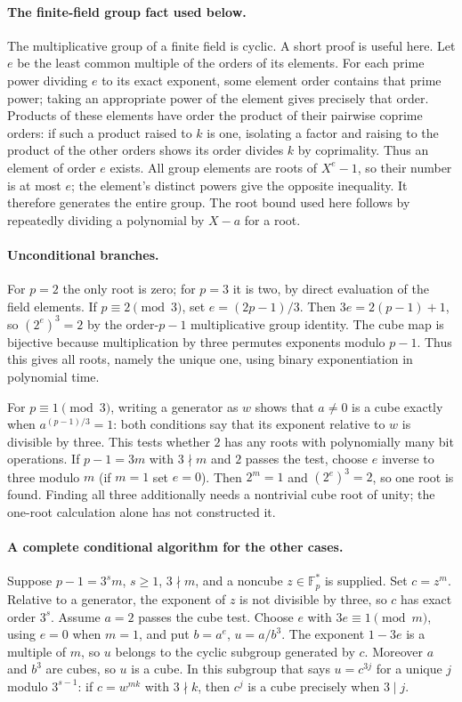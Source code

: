 \documentclass[11pt]{article}
\begin{document}
\paragraph{The finite-field group fact used below.}
The multiplicative group of a finite field is cyclic. A short proof
is useful here. Let $e$ be the least common multiple of the orders
of its elements. For each prime power dividing $e$ to its exact
exponent, some element order contains that prime power; taking an
appropriate power of the element gives precisely that order. Products
of these elements have order the product of their pairwise coprime
orders: if such a product raised to $k$ is one, isolating a factor
and raising to the product of the other orders shows its order divides
$k$ by coprimality. Thus an element of order $e$ exists. All group
elements are roots of $X^e-1$, so their number is at most $e$;
the element's distinct powers give the opposite inequality. It
therefore generates the entire group. The root bound used here
follows by repeatedly dividing a polynomial by $X-a$ for a root.

\paragraph{Unconditional branches.}
For $p=2$ the only root is zero; for $p=3$ it is two, by direct
evaluation of the field elements. If $p\equiv2\pmod3$, set
$e=(2p-1)/3$. Then $3e=2(p-1)+1$, so
$(2^e)^3=2$ by the order-$p-1$ multiplicative group identity.
The cube map is bijective because multiplication by three permutes
exponents modulo $p-1$. Thus this gives all roots, namely the unique
one, using binary exponentiation in polynomial time.

For $p\equiv1\pmod3$, writing a generator as $w$ shows that
$a\ne0$ is a cube exactly when $a^{(p-1)/3}=1$: both conditions
say that its exponent relative to $w$ is divisible by three.
This tests whether $2$ has any roots with polynomially many bit
operations. If $p-1=3m$ with $3\nmid m$ and $2$ passes the
test, choose $e$ inverse to three modulo $m$ (if $m=1$ set $e=0$).
Then $2^m=1$ and $(2^e)^3=2$, so one root is found.
Finding all three additionally needs a nontrivial cube root of unity;
the one-root calculation alone has not constructed it.

\paragraph{A complete conditional algorithm for the other cases.}
Suppose $p-1=3^s m$, $s\ge1$, $3\nmid m$, and a noncube
$z\in\mathbb F_p^*$ is supplied. Set $c=z^m$. Relative to
a generator, the exponent of $z$ is not divisible by three,
so $c$ has exact order $3^s$. Assume $a=2$ passes the cube test.
Choose $e$ with $3e\equiv1\pmod m$, using $e=0$ when $m=1$,
and put $b=a^e$, $u=a/b^3$. The exponent $1-3e$ is a multiple
of $m$, so $u$ belongs to the cyclic subgroup generated by $c$.
Moreover $a$ and $b^3$ are cubes, so $u$ is a cube. In this
subgroup that says $u=c^{3j}$ for a unique $j$ modulo $3^{s-1}$:
if $c=w^{mk}$ with $3\nmid k$, then $c^j$ is a cube
precisely when $3\mid j$.
\end{document}
